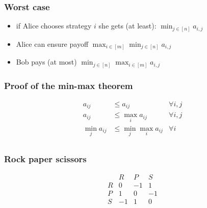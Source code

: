 \documentclass[aspectratio=149]{beamer}
\begin{document}
\begin{frame}
  \frametitle{Worst case}

  \begin{itemize}
    \item if Alice chooses strategy $i$ she gets (at least): $\min_{j\in [n]} a_{i,j}$
    \item Alice can ensure payoff $\max_{i\in [m]} \min_{j\in [n]} a_{i,j}$
    \item Bob pays (at most) $\min_{j\in [n]} \max_{i\in [m]} a_{i,j}$
  \end{itemize}
\end{frame}

\begin{frame}
  \frametitle{Proof of the min-max theorem}
  \begin{equation}
    \begin{aligned}
      a_{ij} &\le a_{ij} & \forall i,j \\
      a_{ij} &\le \max_i a_{ij} & \forall i,j\\
      \min_j a_{ij} &\le \min_j \max_i a_{ij} & \forall i\\
    \end{aligned}
  \end{equation}
\end{frame}


\begin{frame}
  \frametitle{Rock paper scissors}
  \begin{equation}
    \begin{array}{l|ccc}
        & R & P & S \\
      \hline
      R & 0 & -1 & 1 \\
      P & 1 & 0 & -1 \\
      S & -1 & 1 & 0
    \end{array}
  \end{equation}
\end{frame}
\end{document}
